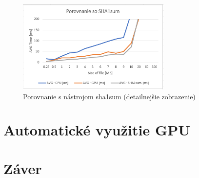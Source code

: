\documentclass[conference]{IEEEtran}
\begin{document}
\begin{figure}[h!]
\centering
\includegraphics[width=3in]{img/sha1sumdetail}
\caption{Porovnanie s nástrojom sha1sum  (detailnejšie zobrazenie)}
\end{figure}


\section{Automatické využitie GPU}


\section{Záver}
\end{document}
